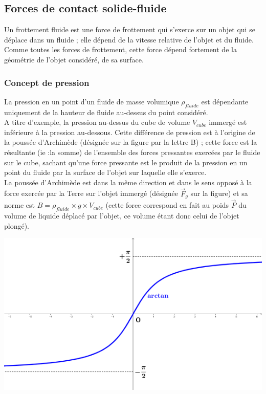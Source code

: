\documentclass[a4paper,10pt]{book}
\begin{document}
\subsection{Forces de contact solide-fluide}
Un frottement fluide est une force de frottement qui s’exerce sur un objet qui se déplace dans un fluide ; elle dépend de la vitesse relative de l’objet et du fluide. Comme toutes les forces de frottement, cette force dépend fortement de la géométrie de l’objet considéré, de sa surface.\\

\subsubsection{Concept de pression}
La pression en un point d’un fluide de masse volumique $\rho_{fluide}$ est dépendante uniquement de la hauteur de fluide au-dessus du point considéré.\\

A titre d’exemple, la pression au-dessus du cube de volume $V_{cube}$ immergé est inférieure à la pression au-dessous. Cette différence de pression est à l’origine de la poussée d’Archimède (désignée sur la figure par la lettre B) ; cette force est la résultante (ie :la somme) de l’ensemble des forces pressantes exercées par le fluide sur le cube, sachant qu’une force pressante est le produit de la pression en un point du fluide par la surface de l’objet sur laquelle elle s’exerce.\\

La poussée d’Archimède est dans la même direction et dans le sens opposé à la force exercée par la Terre sur l’objet immergé (désignée $\vec{F}_{g}$ sur la figure) et sa norme est $B=\rho_{fluide}\times g\times V_{cube}$ (cette force correspond en fait au poids $\vec{P}$ du volume de liquide déplacé par l'objet, ce volume étant donc celui de l'objet plongé).\\

\begin{center} \includegraphics[scale=1.15]{images/018.png} \end{center}
\newpage
\end{document}
